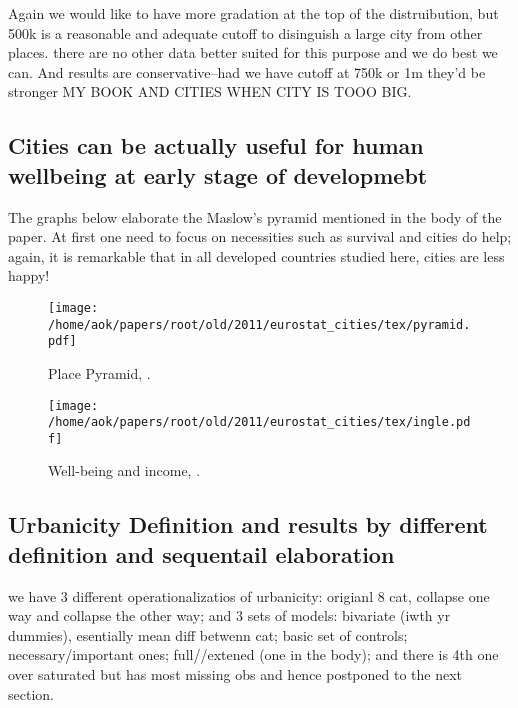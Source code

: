 \documentclass[10pt, letterpaper]{article}
\begin{document}
\begin{spacing}{1.4}
Again we would like
to have more gradation at the top of the distruibution, but 500k is a reasonable
and adequate cutoff to disinguish a large city from other places. there are no
other data better suited for this purpose and we do best we can. And results are
conservative--had we have cutoff at 750k or 1m they'd be stronger MY BOOK AND
CITIES WHEN CITY IS TOOO BIG. 


\subsection{Cities can be actually useful for human wellbeing at early stage of
  developmebt}

The graphs below elaborate the Maslow's pyramid mentioned in the body of the paper.
At first one need to focus on necessities such as survival and cities do help;
again, it is remarkable that in all developed countries studied here, cities are less happy!

\begin{figure}[h!]
\begin{centering}
 \texttt{[image: /home/aok/papers/root/old/2011/eurostat\_cities/tex/pyramid.pdf]}
 \caption{Place Pyramid, \citep[p 294]{florida08}.} \label{pyramid}
  \end{centering}
\end{figure}

\begin{figure}[h!]
\begin{centering}
 \texttt{[image: /home/aok/papers/root/old/2011/eurostat\_cities/tex/ingle.pdf]}
 \caption{Well-being and income, \citep{inglehart97}.} \label{ingle}
  \end{centering}
\end{figure}


\subsection{Urbanicity Definition and results by different definition and
  sequentail elaboration}

we have 3 different operationalizatios of urbanicity: origianl 8 cat, collapse
one way and collapse the other way; and 3 sets of models: bivariate (iwth yr
dummies), esentially mean diff betwenn cat; basic set of controls;
necessary/important ones; full//extened (one in the body); and there is 4th one
over saturated but has most missing obs and hence postponed to the next section. 


\end{spacing}
\end{document}
